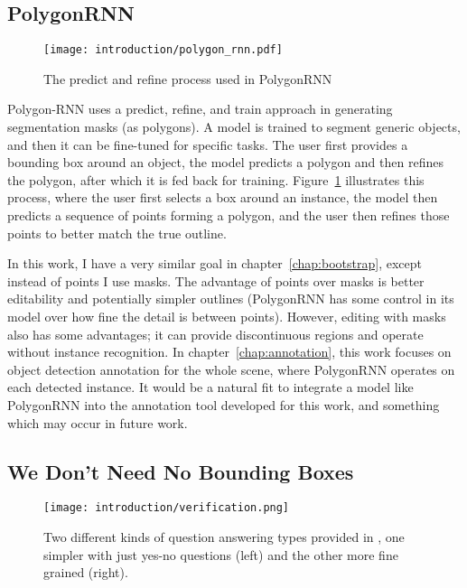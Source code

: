 \subsection {PolygonRNN \cite{Castrejon2017}}

\begin{figure}[h]
  \centering
  \texttt{[image: introduction/polygon\_rnn.pdf]}
  \caption{The predict and refine process used in PolygonRNN \cite{Castrejon2017}}  
  \label{fig:polygon_rnn}
\end{figure}


Polygon-RNN \cite{Castrejon2017} uses a predict, refine, and train approach in generating segmentation masks (as polygons). A model is trained to segment generic objects, and then it can be fine-tuned for specific tasks. The user first provides a bounding box around an object, the model predicts a polygon and then refines the polygon,  after which it is fed back for training. Figure~\ref{fig:polygon_rnn} illustrates this process, where the user first selects a box around an instance, the model then predicts a sequence of points forming a polygon, and the user then refines those points to better match the true outline.

In this work, I have a very similar goal in chapter~\ref{chap:bootstrap}, except instead of points I use masks. The advantage of points over masks is better editability and potentially simpler outlines (PolygonRNN has some control in its model over how fine the detail is between points). However, editing with masks also has some advantages; it can provide discontinuous regions and operate without instance recognition. In chapter~\ref{chap:annotation}, this work focuses on object detection annotation for the whole scene, where PolygonRNN operates on each detected instance. It would be a natural fit to integrate a model like PolygonRNN into the annotation tool developed for this work, and something which may occur in future work.


\subsection {We Don't Need No Bounding Boxes}

\begin{figure}[h]
  \centering
  \texttt{[image: introduction/verification.png]}
  \caption{Two different kinds of question answering types provided in \cite{Papadopoulos2016}, one simpler with just yes-no questions (left) and the other more fine grained (right).}
  \label{fig:verification}
\end{figure}


